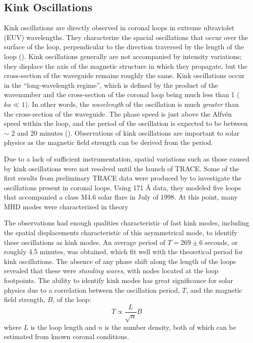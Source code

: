 \documentclass[preprint2]{aastex}
\begin{document}
\subsection{Kink Oscillations}\label{kink}
Kink oscillations are directly observed in coronal loops in extreme
ultraviolet (EUV) wavelengths.
They characterize the spacial oscillations that occur over the surface of
the loop, perpendicular to the direction traversed by the length
of the loop (\cite{Nak}).
Kink oscillations generally are not accompanied by intensity variations;
they displace the axis of the magnetic structure in which they propagate,
but the cross-section of the waveguide remains roughly the same.
Kink oscillations occur in the ``long-wavelength regime'',
which is defined by
the product of the wavenumber and the cross-section of the coronal
loop being much less than 1 ($ka \ll 1$). In other words, the
\emph{wavelength} of the oscillation is much \emph{greater} than the
cross-section of the waveguide.
The phase speed is just above the Alfv\'en speed within the loop,
and the period of the oscillation is expected to be between
$\sim$ 2 and 20 minutes (\cite{Asc}).
Observations of kink oscillations are important to solar physics as
the magnetic field strength can be derived from the period.

Due to a lack of sufficient instrumentation,
spatial variations such as those caused by kink oscillations
were not resolved until the launch of TRACE\@.
Some of the first results from preliminary TRACE data were produced by
\cite{kink_1} to investigate the oscillations present in coronal loops.
Using 171 \AA{} data, they modeled five loops
that accompanied a class M4.6 solar flare in July of 1998.
At this point, many MHD modes were characterized in theory

The observations had enough qualities characteristic of
fast kink modes, including the spatial displacements characteristic
of this asymmetrical mode, to identify these oscillations as kink
modes.
An average period of $T = 269 \pm 6$ seconds, or
roughly 4.5 minutes, was obtained, which fit well with the theoretical
period for kink oscillations.
The absence of any phase
shift along the length of the loops revealed that these were
\emph{standing waves}, with nodes located at the loop footpoints.
The ability to identify kink modes has great significance
for solar physics due to a correlation between the oscillation period,
$T$, and the magnetic field strength, $B$, of the loop:
\begin{equation}
    T \propto \frac{L}{\sqrt{n}}{B}
\end{equation}
where $L$ is the loop length and $n$ is the number density,
both of which can be estimated from known coronal conditions.
\end{document}
